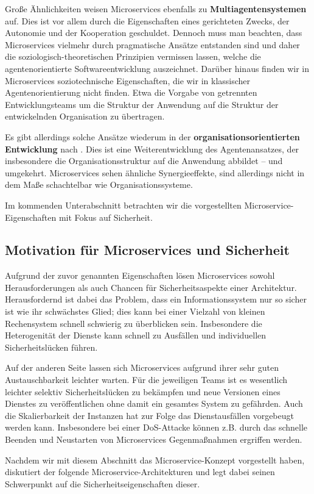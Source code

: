 Große Ähnlichkeiten weisen Microservices ebenfalls zu \textbf{Multiagentensystemen} auf. Dies ist vor allem durch die Eigenschaften eines gerichteten Zwecks, der Autonomie und der Kooperation geschuldet. Dennoch muss man beachten, dass Microservices vielmehr durch pragmatische Ansätze entstanden sind und daher die soziologisch-theoretischen Prinzipien vermissen lassen, welche die agentenorientierte Softwareentwicklung auszeichnet. Darüber hinaus finden wir in Microservices soziotechnische Eigenschaften, die wir in klassischer Agentenorientierung nicht finden. Etwa die Vorgabe von getrennten Entwicklungsteams um die Struktur der Anwendung auf die Struktur der entwickelnden Organisation zu übertragen. 

Es gibt allerdings solche Ansätze wiederum in der \textbf{organisationsorientierten Entwicklung} nach \cite{Wester-Ebbinghaus10}. Dies ist eine Weiterentwicklung des Agentenansatzes, der insbesondere die Organisationsstruktur auf die Anwendung abbildet – und umgekehrt. Microservices sehen ähnliche Synergieeffekte, sind allerdings nicht in dem Maße schachtelbar wie Organisationssysteme.

Im kommenden Unterabschnitt betrachten wir die vorgestellten Microservice-Eigenschaften mit Fokus auf Sicherheit.

\subsection{Motivation für Microservices und Sicherheit}
\label{subsec:motivation}

Aufgrund der zuvor genannten Eigenschaften lösen Microservices sowohl Herausforderungen als auch Chancen für Sicherheitsaspekte einer Architektur. Herausfordernd ist dabei das Problem, dass ein Informationssystem nur so sicher ist wie ihr schwächstes Glied; dies kann bei einer Vielzahl von kleinen Rechensystem schnell schwierig zu überblicken sein. Insbesondere die Heterogenität der Dienste kann schnell zu Ausfällen und individuellen Sicherheitslücken führen.

Auf der anderen Seite lassen sich Microservices aufgrund ihrer sehr guten Austauschbarkeit leichter warten. Für die jeweiligen Teams ist es wesentlich leichter selektiv Sicherheitslücken zu bekämpfen und neue Versionen eines Dienstes zu veröffentlichen ohne damit ein gesamtes System zu gefährden. Auch die Skalierbarkeit der Instanzen hat zur Folge das Dienstausfällen vorgebeugt werden kann. Insbesondere bei einer DoS-Attacke können z.B. durch das schnelle Beenden und Neustarten von Microservices Gegenmaßnahmen ergriffen werden.

Nachdem wir mit diesem Abschnitt das Microservice-Konzept vorgestellt haben, diskutiert der folgende Microservice-Architekturen und legt dabei seinen Schwerpunkt auf die Sicherheitseigenschaften dieser.